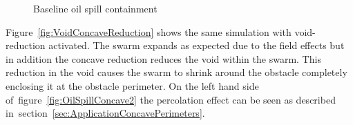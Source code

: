 \begin{figure}[H]
\centering
{}
\caption{Baseline oil spill containment}
\label{fig:OilSpillConcaveReduction1}
\end{figure}

Figure~\ref{fig:VoidConcaveReduction} shows the same simulation with void-reduction activated. The swarm expands as expected due to the field effects but in addition the concave reduction reduces the void within the swarm. This reduction in the void causes the swarm to shrink around the obstacle completely enclosing it at the obstacle perimeter. On the left hand side of~figure~\ref{fig:OilSpillConcave2} the percolation effect can be seen as described in~section~\ref{sec:ApplicationConcavePerimeters}.

